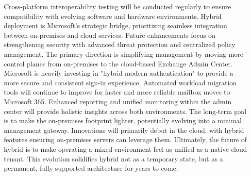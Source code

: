 Cross-platform interoperability testing will be conducted regularly to ensure compatibility with evolving software and hardware environments.
Hybrid deployment is Microsoft's strategic bridge, prioritizing seamless integration between on-premises and cloud services.
Future enhancements focus on strengthening security with advanced threat protection and centralized policy management.
The primary direction is simplifying management by moving more control planes from on-premises to the cloud-based Exchange Admin Center.
Microsoft is heavily investing in "hybrid modern authentication" to provide a more secure and consistent sign-in experience.
Automated workload migration tools will continue to improve for faster and more reliable mailbox moves to Microsoft 365.
Enhanced reporting and unified monitoring within the admin center will provide holistic insights across both environments.
The long-term goal is to make the on-premises footprint lighter, potentially evolving into a minimal management gateway.
Innovations will primarily debut in the cloud, with hybrid features ensuring on-premises servers can leverage them.
Ultimately, the future of hybrid is to make operating a mixed environment feel as unified as a native cloud tenant.
This evolution solidifies hybrid not as a temporary state, but as a permanent, fully-supported architecture for years to come.


